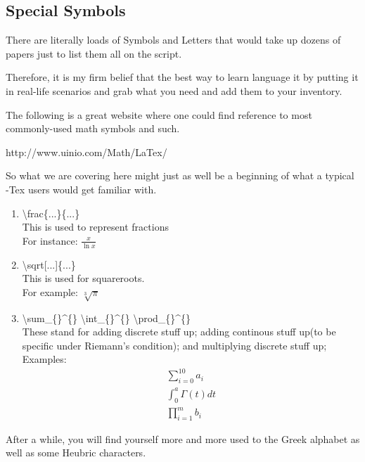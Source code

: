 \documentclass[a4paper,12pt]{article}
\begin{document}
\subsection{Special Symbols}
There are literally loads of Symbols and Letters that would 
take up dozens of papers just to list them all on the script.

Therefore, it is my firm belief that the best way to learn language
it by putting it in real-life scenarios and grab what you need 
and add them to your inventory.

The following is a great website where one could find reference
to most commonly-used math symbols and such.

http://www.uinio.com/Math/LaTex/

So what we are covering here might just as well be a beginning of
what a typical -Tex users would get familiar with.

\begin{enumerate}
    \item \textbackslash frac\{...\}\{...\}
    \\ This is used to represent fractions
    \\ For instance: $\frac{x}{\ln x}$
    \item \textbackslash sqrt[...]\{...\}
    \\ This is used for squareroots.
    \\ For example: $\sqrt[3]{\pi}$
    \item \textbackslash sum\_{}\{\}\^{}\{\}
     \textbackslash int\_{}\{\}\^{}\{\}
     \textbackslash prod\_{}\{\}\^{}\{\}
    \\ These stand for adding discrete stuff up; 
    adding continous stuff up(to be specific under Riemann's condition);
    and multiplying discrete stuff up;
    \\Examples:
    \begin{eqnarray}
        \sum_{i=0}^{10}a_{i}\\
    \int_{0}^{a}\Gamma(t)dt\\
        \prod_{i=1}^{m}b_{i}
    \end{eqnarray}
\end{enumerate}

After a while, you will find yourself more and more used to the Greek
 alphabet as well as some Heubric characters. 

\end{document}

